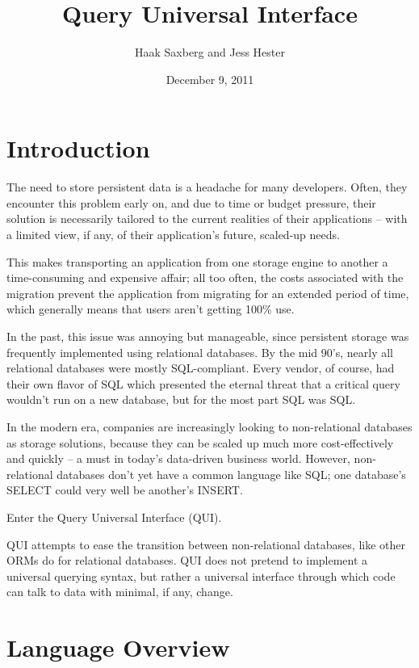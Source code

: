 \documentclass{article} %
\title{Query Universal Interface}
\author{Haak Saxberg and Jess Hester}
\date{December 9, 2011}
\begin{document}
\maketitle
\newpage

\tableofcontents
\lstlistoflistings
\listoffigures

\newpage
\section{Introduction}
The need to store persistent data is a headache for many developers. Often, they encounter this problem early on, and due to time
or budget pressure, their solution is necessarily tailored to the current realities of their applications -- with a limited view, if any, of 
their application's future, scaled-up needs.

This makes transporting an application from one storage engine to another a time-consuming and expensive affair; all too often, the
costs associated with the migration prevent the application from migrating for an extended period of time, which generally means that
users aren't getting 100\% use.

In the past, this issue was annoying but manageable, since persistent storage was frequently implemented using relational databases.
By the mid 90's, nearly all relational databases were mostly SQL-compliant. Every vendor, of course, had their own flavor of SQL which
presented the eternal threat that a critical query wouldn't run on a new database, but for the most part SQL was SQL.

In the modern era, companies are increasingly looking to non-relational databases as storage solutions, because they can be scaled up
much more cost-effectively and quickly -- a must in today's data-driven business world. However, non-relational databases don't yet have
a common language like SQL; one database's SELECT could very well be another's INSERT.

Enter the Query Universal Interface (QUI).

QUI attempts to ease the transition between non-relational databases, like other ORMs do for relational databases. QUI does not pretend
to implement a universal querying syntax, but rather a universal interface through which code can talk to data with minimal, if any, change.

\section{Language Overview}
\end{document}
